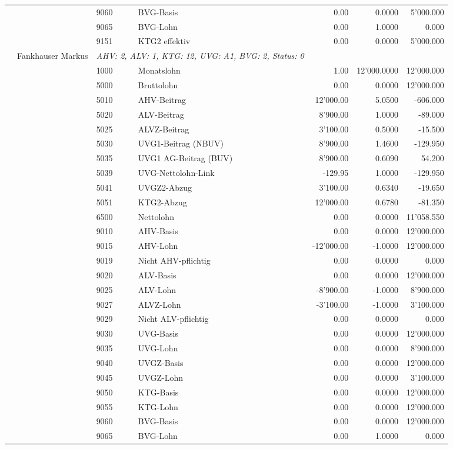 \documentclass[15pt,a4paper]{article}
\begin{document}
\begin{longtable}{@{\extracolsep{\fill}}l l l l|r|r|r}
&&9060&BVG-Basis&0.00&0.0000&5'000.000\\
&&9065&BVG-Lohn&0.00&1.0000&0.000\\
&&9151&KTG2 effektiv&0.00&0.0000&5'000.000\\
\pagebreak
24&Fankhauser Markus&\multicolumn{2}{l|}{\small\emph{AHV: 2, ALV: 1, KTG: 12, UVG: A1, BVG: 2, Status: 0}}&& \\
&&1000&Monatslohn&1.00&12'000.0000&12'000.000\\
&&5000&Bruttolohn&0.00&0.0000&12'000.000\\
&&5010&AHV-Beitrag&12'000.00&5.0500&-606.000\\
&&5020&ALV-Beitrag&8'900.00&1.0000&-89.000\\
&&5025&ALVZ-Beitrag&3'100.00&0.5000&-15.500\\
&&5030&UVG1-Beitrag (NBUV)&8'900.00&1.4600&-129.950\\
&&5035&UVG1 AG-Beitrag (BUV)&8'900.00&0.6090&54.200\\
&&5039&UVG-Nettolohn-Link&-129.95&1.0000&-129.950\\
&&5041&UVGZ2-Abzug&3'100.00&0.6340&-19.650\\
&&5051&KTG2-Abzug&12'000.00&0.6780&-81.350\\
&&6500&Nettolohn&0.00&0.0000&11'058.550\\
&&9010&AHV-Basis&0.00&0.0000&12'000.000\\
&&9015&AHV-Lohn&-12'000.00&-1.0000&12'000.000\\
&&9019&Nicht AHV-pflichtig&0.00&0.0000&0.000\\
&&9020&ALV-Basis&0.00&0.0000&12'000.000\\
&&9025&ALV-Lohn&-8'900.00&-1.0000&8'900.000\\
&&9027&ALVZ-Lohn&-3'100.00&-1.0000&3'100.000\\
&&9029&Nicht ALV-pflichtig&0.00&0.0000&0.000\\
&&9030&UVG-Basis&0.00&0.0000&12'000.000\\
&&9035&UVG-Lohn&0.00&0.0000&8'900.000\\
&&9040&UVGZ-Basis&0.00&0.0000&12'000.000\\
&&9045&UVGZ-Lohn&0.00&0.0000&3'100.000\\
&&9050&KTG-Basis&0.00&0.0000&12'000.000\\
&&9055&KTG-Lohn&0.00&0.0000&12'000.000\\
&&9060&BVG-Basis&0.00&0.0000&12'000.000\\
&&9065&BVG-Lohn&0.00&1.0000&0.000\\

\end{longtable}
\end{document}
